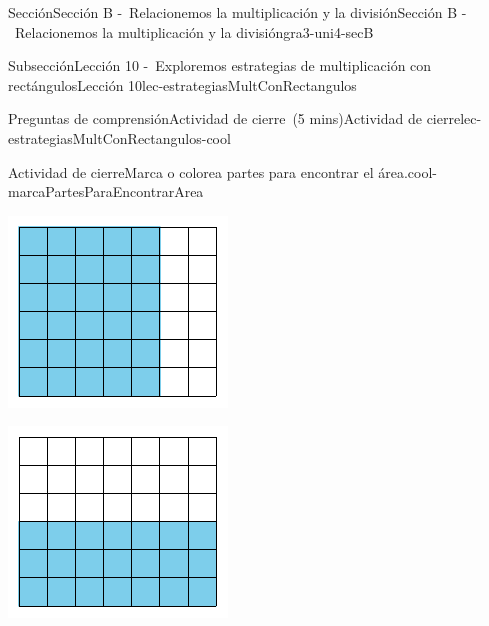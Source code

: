 \documentclass[oneside,10pt,]{article}
\begin{document}
\begin{sectionptx}{Sección}{Sección B -~Relacionemos la multiplicación y la división}{}{Sección B -~Relacionemos la multiplicación y la división}{}{}{gra3-uni4-secB}
\begin{subsectionptx}{Subsección}{Lección 10 -~Exploremos estrategias de multiplicación con rectángulos}{}{Lección 10}{}{}{lec-estrategiasMultConRectangulos}
\begin{reading-questions-subsubsection}{Preguntas de comprensión}{Actividad de cierre~(5 mins)}{}{Actividad de cierre}{}{}{lec-estrategiasMultConRectangulos-cool}
\begin{project}{Actividad de cierre}{Marca o colorea partes para encontrar el área.}{cool-marcaPartesParaEncontrarArea}
\begin{enumerate}[label={(\alph*)}]
\begin{sidebyside}{3}{0.0166666666666667}{0.0166666666666667}{0.0333333333333333}
\begin{sbspanel}{0.35}
\includegraphics[width=\linewidth]{external/svg-source/tikz-file-153041.pdf}
\end{sbspanel}%
\begin{sbspanel}{0.35}%
\includegraphics[width=\linewidth]{external/svg-source/tikz-file-176321.pdf}
\end{sbspanel}%
\end{sidebyside}%
%

\end{enumerate}
\end{project}
\end{reading-questions-subsubsection}
\end{subsectionptx}
\end{sectionptx}
\end{document}
